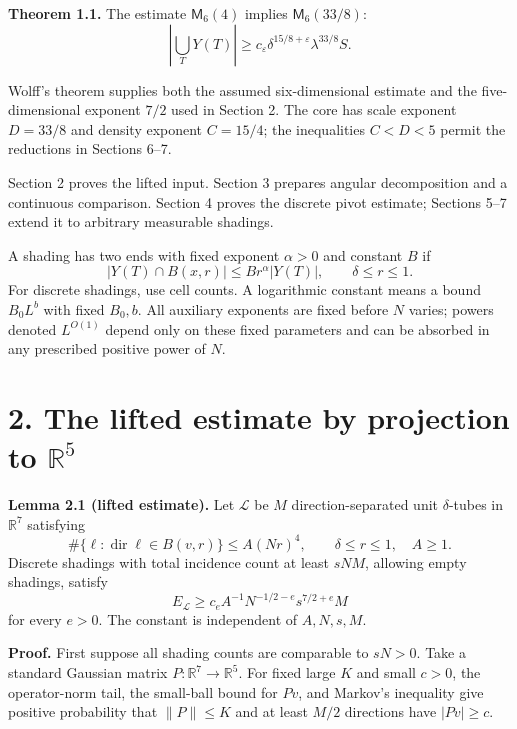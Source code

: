 \documentclass[
  11pt,
  a4paper,
]{article}
\begin{document}
\textbf{Theorem 1.1.} The estimate \(\mathsf M_6(4)\) implies
\(\mathsf M_6(33/8)\): \[
 \left|\bigcup_TY(T)\right|
 \ge c_\varepsilon\delta^{15/8+\varepsilon}
       \lambda^{33/8}S.
\tag{2}\label{eq:2}
\]

Wolff's theorem supplies both the assumed six-dimensional estimate and
the five-dimensional exponent \(7/2\) used in Section 2. The core has
scale exponent \(D=33/8\) and density exponent \(C=15/4\); the
inequalities \(C<D<5\) permit the reductions in Sections 6--7.

Section 2 proves the lifted input. Section 3 prepares angular
decomposition and a continuous comparison. Section 4 proves the discrete
pivot estimate; Sections 5--7 extend it to arbitrary measurable
shadings.

A shading has two ends with fixed exponent \(\alpha>0\) and constant
\(B\) if \[
 |Y(T)\cap B(x,r)|\le Br^\alpha |Y(T)|,\qquad \delta\le r\le1.
\tag{3}\label{eq:3}
\] For discrete shadings, use cell counts. A logarithmic constant means
a bound \(B_0L^b\) with fixed \(B_0,b\). All auxiliary exponents are
fixed before \(N\) varies; powers denoted \(L^{O(1)}\) depend only on
these fixed parameters and can be absorbed in any prescribed positive
power of \(N\).

\hypertarget{the-lifted-estimate-by-projection-to-mathbb-r5}{%
\section{\texorpdfstring{2. The lifted estimate by projection to
\(\mathbb R^5\)}{2. The lifted estimate by projection to \textbackslash mathbb R\^{}5}}\label{the-lifted-estimate-by-projection-to-mathbb-r5}}

\textbf{Lemma 2.1 (lifted estimate).} Let \(\mathcal L\) be \(M\)
direction-separated unit \(\delta\)-tubes in \(\mathbb R^7\) satisfying
\[
 \#\{\ell:\operatorname{dir}\ell\in B(v,r)\}
 \le A(Nr)^4,\qquad \delta\le r\le1,\quad A\ge1.
\tag{4}\label{eq:4}
\] Discrete shadings with total incidence count at least \(sNM\),
allowing empty shadings, satisfy \[
 E_{\mathcal L}\ge c_eA^{-1}N^{-1/2-e}s^{7/2+e}M
\tag{5}\label{eq:5}
\] for every \(e>0\). The constant is independent of \(A,N,s,M\).

\textbf{Proof.} First suppose all shading counts are comparable to
\(sN>0\). Take a standard Gaussian matrix
\(P:\mathbb R^7\to\mathbb R^5\). For fixed large \(K\) and small
\(c>0\), the operator-norm tail, the small-ball bound for \(Pv\), and
Markov's inequality give positive probability that \(\|P\|\le K\) and at
least \(M/2\) directions have \(|Pv|\ge c\).
\end{document}
